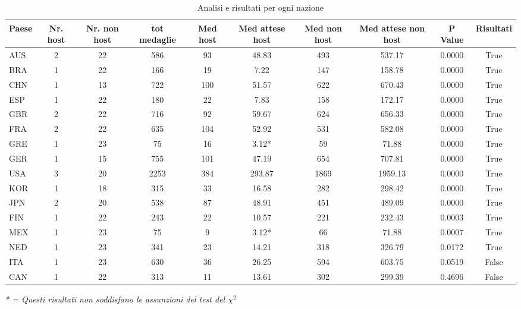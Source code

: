 \begin{table}[H]
\centering
\caption{Analisi e risultati per ogni nazione}
\label{tab:medaglie_chi2}
\small 
\setlength{\tabcolsep}{2pt} 
\begin{tabularx}{\textwidth}{@{} l *{9}{C} @{}}
\toprule
\textbf{Paese} & \textbf{Nr. host} & \textbf{Nr. non host} & \textbf{tot medaglie} 
& \textbf{Med host} & \textbf{Med attese host} & \textbf{Med non host} & 
\textbf{Med attese non host} & \textbf{P Value} & \textbf{Risultati} \\
\midrule
AUS & 2 & 22 & 586  & 93  & 48.83  & 493  & 537.17 & 0.0000 & True  \\
BRA & 1 & 22 & 166  & 19  & 7.22   & 147  & 158.78 & 0.0000 & True  \\
CHN & 1 & 13 & 722  & 100 & 51.57  & 622  & 670.43 & 0.0000 & True  \\
ESP & 1 & 22 & 180  & 22  & 7.83   & 158  & 172.17 & 0.0000 & True  \\
GBR & 2 & 22 & 716  & 92  & 59.67  & 624  & 656.33 & 0.0000 & True  \\
FRA & 2 & 22 & 635  & 104 & 52.92  & 531  & 582.08 & 0.0000 & True  \\
GRE & 1 & 23 & 75   & 16  & 3.12*  & 59   & 71.88  & 0.0000 & True  \\
GER & 1 & 15 & 755  & 101 & 47.19  & 654  & 707.81 & 0.0000 & True  \\
USA & 3 & 20 & 2253 & 384 & 293.87 & 1869 & 1959.13& 0.0000 & True  \\
KOR & 1 & 18 & 315  & 33  & 16.58  & 282  & 298.42 & 0.0000 & True  \\
JPN & 2 & 20 & 538  & 87  & 48.91  & 451  & 489.09 & 0.0000 & True  \\
FIN & 1 & 22 & 243  & 22  & 10.57  & 221  & 232.43 & 0.0003 & True  \\
MEX & 1 & 23 & 75   & 9   & 3.12*  & 66   & 71.88  & 0.0007 & True  \\
NED & 1 & 23 & 341  & 23  & 14.21  & 318  & 326.79 & 0.0172 & True  \\
ITA & 1 & 23 & 630  & 36  & 26.25  & 594  & 603.75 & 0.0519 & False \\
CAN & 1 & 22 & 313  & 11  & 13.61  & 302  & 299.39 & 0.4696 & False \\
\bottomrule
\end{tabularx}
\vspace{2pt} 
\raggedright 
\scriptsize 
\textit{* = Questi risultati non soddisfano le assunzioni del test del $\chi^2$}
\end{table}

